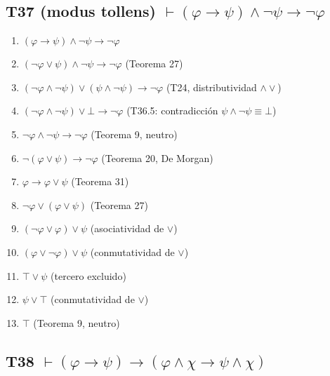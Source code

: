 \subsection{T37 (modus tollens) $\vdash (\varphi \rightarrow \psi) \land \neg\psi \rightarrow \neg\varphi$}

\begin{enumerate}
    \item $(\varphi \rightarrow \psi) \land \neg\psi \rightarrow \neg\varphi$
    \item $(\neg\varphi \lor \psi) \land \neg\psi \rightarrow \neg\varphi$ \hfill (Teorema 27)
    \item $(\neg\varphi \land \neg\psi) \lor (\psi \land \neg\psi) \rightarrow \neg\varphi$ \hfill (T24, distributividad $\land\lor$)
    \item $(\neg\varphi \land \neg\psi) \lor \bot \rightarrow \neg\varphi$ \hfill (T36.5: contradicción $\psi \land \neg\psi \equiv \bot$)
    \item $\neg\varphi \land \neg\psi \rightarrow \neg\varphi$ \hfill (Teorema 9, neutro)
    \item $\neg(\varphi \lor \psi) \rightarrow \neg\varphi$ \hfill (Teorema 20, De Morgan)
    \item $\varphi \rightarrow \varphi \lor \psi$ \hfill (Teorema 31)
    \item $\neg\varphi \lor (\varphi \lor \psi)$ \hfill (Teorema 27)
    \item $(\neg\varphi \lor \varphi) \lor \psi$ \hfill (asociatividad de $\lor$)
    \item $(\varphi \lor \neg\varphi) \lor \psi$ \hfill (conmutatividad de $\lor$)
    \item $\top \lor \psi$ \hfill (tercero excluido)
    \item $\psi \lor \top$ \hfill (conmutatividad de $\lor$)
    \item $\top $ \hfill (Teorema 9, neutro)
\end{enumerate}

\subsection{T38 $\vdash (\varphi \rightarrow \psi) \rightarrow (\varphi \land \chi \rightarrow \psi \land \chi)$}

